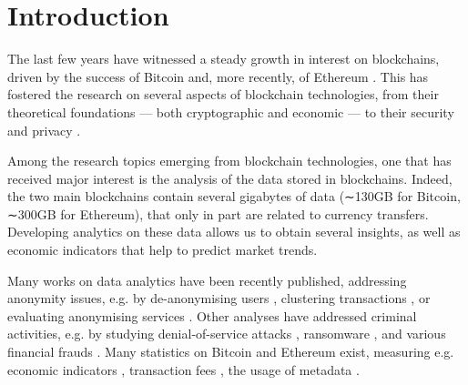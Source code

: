 \label{Chapter1}

\chapter{Introduction}
The last few years have witnessed a steady growth in interest on blockchains, driven by the success of Bitcoin and, more recently, of Ethereum \cite{wood2014ethereum}. This has fostered the research on several aspects of blockchain technologies, from their theoretical foundations — both cryptographic \cite{clark2015research, garay2015bitcoin} and economic \cite{luu2015power, schrijvers2016incentive} — to their
security and privacy \cite{androulaki2013evaluating, bonneau2014mixcoin, gervais2016security, karame2015misbehavior, meiklejohn2013fistful}.

Among the research topics emerging from blockchain technologies, one that has received major interest is the analysis of the data stored in blockchains. Indeed, the two main blockchains contain several gigabytes of data (∼130GB for Bitcoin, ∼300GB for Ethereum), that only in part are related to currency transfers. Developing analytics on these data allows us to obtain several insights, as well as economic indicators that help to predict market trends.

Many works on data analytics have been recently published, addressing anonymity issues, e.g. by de-anonymising users \cite{meiklejohn2013fistful,ober2013structure,reid2013analysis}, clustering transactions \cite{vasek2015there,harrigan2016unreasonable}, or evaluating anonymising services \cite{moser2017anonymous}. Other analyses have addressed criminal activities, e.g. by studying denial-of-service attacks \cite{baqer2016stressing,vasek2014empirical}, ransomware \cite{liao2016behind}, and various financial frauds \cite{moser2013inquiry}. Many statistics on Bitcoin and Ethereum exist, measuring e.g. economic indicators \cite{lischke2016analyzing}, transaction fees \cite{moser2015trends}, the usage of metadata \cite{bartoletti2017analysis}.

